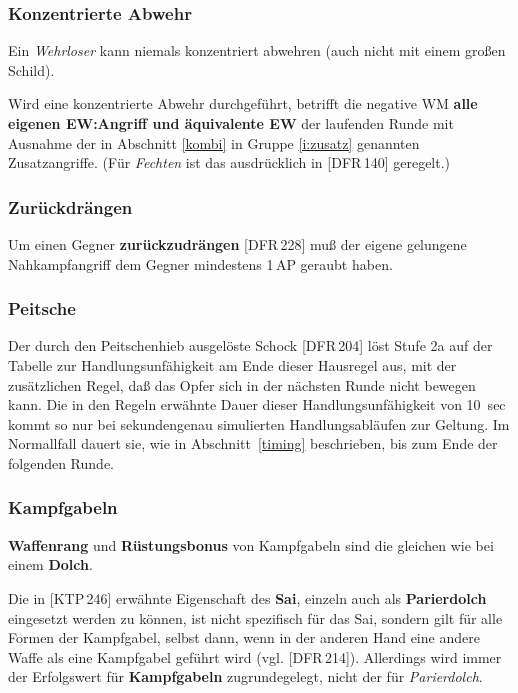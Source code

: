 \documentclass[10pt,a4paper,germanpar]{article}
\begin{document}
\subsubsection{Konzentrierte Abwehr}

Ein \emph{Wehrloser} kann niemals konzentriert abwehren (auch nicht
mit einem großen Schild).

Wird eine konzentrierte Abwehr durchgeführt, betrifft die negative WM
\textbf{alle eigenen EW:Angriff und äquivalente EW} der laufenden
Runde mit Ausnahme der in Abschnitt \ref{kombi} in Gruppe
\ref{i:zusatz} genannten Zusatzangriffe. (Für \emph{Fechten} ist
das ausdrücklich in [DFR\,140] geregelt.)

\subsubsection{Zurückdrängen}

Um einen Gegner \textbf{zurückzudrängen} [DFR\,228] muß der eigene
gelungene Nahkampfangriff dem Gegner mindestens 1\,AP geraubt haben.

\subsubsection{Peitsche}

Der durch den Peitschenhieb ausgelöste Schock [DFR\,204] löst Stufe 2a
auf der Tabelle zur Handlungsunfähigkeit am Ende dieser Hausregel aus,
mit der zusätzlichen Regel, daß das Opfer sich in der nächsten Runde
nicht bewegen kann. Die in den Regeln erwähnte Dauer dieser
Handlungsunfähigkeit von 10~sec kommt so nur bei sekundengenau
simulierten Handlungsabläufen zur Geltung. Im Normallfall dauert sie,
wie in Abschnitt~\ref{timing} beschrieben, bis zum Ende der folgenden
Runde.

\subsubsection{Kampfgabeln}

\textbf{Waffenrang} und \textbf{Rüstungsbonus} von Kampfgabeln sind
die gleichen wie bei einem \textbf{Dolch}.

Die in [KTP\,246] erwähnte Eigenschaft des \textbf{Sai}, einzeln auch
als \textbf{Parierdolch} eingesetzt werden zu können, ist nicht
spezifisch für das Sai, sondern gilt für alle Formen der Kampfgabel,
selbst dann, wenn in der anderen Hand eine andere Waffe als eine
Kampfgabel geführt wird (vgl. [DFR\,214]). Allerdings wird immer der
Erfolgswert für \textbf{Kampfgabeln} zugrundegelegt, nicht der für
\emph{Parierdolch}.
\end{document}
